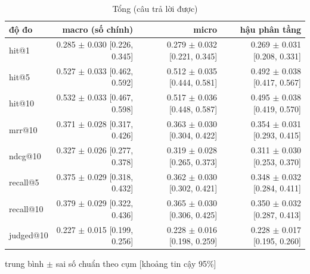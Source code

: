 
\begin{table}[ht]
\centering
\caption{Tổng (câu trả lời được)}
\begin{tabular}{lrrr}
\toprule
độ đo & macro (số chính) & micro & hậu phân tầng \\
\midrule
hit@1 & 0.285 $\pm$ 0.030 [0.226, 0.345] & 0.279 $\pm$ 0.032 [0.221, 0.345] & 0.269 $\pm$ 0.031 [0.208, 0.331] \\
hit@5 & 0.527 $\pm$ 0.033 [0.462, 0.592] & 0.512 $\pm$ 0.035 [0.444, 0.581] & 0.492 $\pm$ 0.038 [0.417, 0.567] \\
hit@10 & 0.532 $\pm$ 0.033 [0.467, 0.598] & 0.517 $\pm$ 0.036 [0.448, 0.587] & 0.495 $\pm$ 0.038 [0.419, 0.570] \\
mrr@10 & 0.371 $\pm$ 0.028 [0.317, 0.426] & 0.363 $\pm$ 0.030 [0.304, 0.422] & 0.354 $\pm$ 0.031 [0.293, 0.415] \\
ndcg@10 & 0.327 $\pm$ 0.026 [0.277, 0.378] & 0.319 $\pm$ 0.028 [0.265, 0.373] & 0.311 $\pm$ 0.030 [0.253, 0.370] \\
recall@5 & 0.375 $\pm$ 0.029 [0.318, 0.432] & 0.362 $\pm$ 0.030 [0.302, 0.421] & 0.348 $\pm$ 0.032 [0.284, 0.411] \\
recall@10 & 0.379 $\pm$ 0.029 [0.322, 0.436] & 0.365 $\pm$ 0.030 [0.306, 0.425] & 0.350 $\pm$ 0.032 [0.287, 0.413] \\
judged@10 & 0.227 $\pm$ 0.015 [0.199, 0.256] & 0.228 $\pm$ 0.016 [0.198, 0.259] & 0.228 $\pm$ 0.017 [0.195, 0.260] \\
\bottomrule
\end{tabular}
\par\smallskip\footnotesize trung bình $\pm$ sai số chuẩn theo cụm [khoảng tin cậy 95\%]
\end{table}

